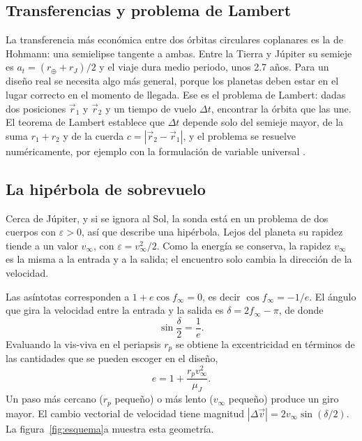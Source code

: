 \documentclass[12pt,letterpaper]{article}
\begin{document}
\subsection{Transferencias y problema de Lambert}

La transferencia más económica entre dos órbitas circulares coplanares es la de Hohmann: una
semielipse tangente a ambas. Entre la Tierra y Júpiter su semieje es $a_t = (r_\oplus +
r_J)/2$ y el viaje dura medio periodo, unos 2.7 años. Para un diseño real se necesita algo
más general, porque los planetas deben estar en el lugar correcto en el momento de llegada.
Ese es el problema de Lambert: dadas dos posiciones $\vec r_1$ y $\vec r_2$ y un tiempo de
vuelo $\Delta t$, encontrar la órbita que las une. El teorema de Lambert establece que
$\Delta t$ depende solo del semieje mayor, de la suma $r_1+r_2$ y de la cuerda
$c=|\vec r_2-\vec r_1|$, y el problema se resuelve numéricamente, por ejemplo con la
formulación de variable universal \cite{curtis2020}.

\subsection{La hipérbola de sobrevuelo}

Cerca de Júpiter, y si se ignora al Sol, la sonda está en un problema de dos cuerpos con
$\varepsilon>0$, así que describe una hipérbola. Lejos del planeta su rapidez tiende a un
valor $v_\infty$, con $\varepsilon = v_\infty^2/2$. Como la energía se conserva, la rapidez
$v_\infty$ es la misma a la entrada y a la salida; el encuentro solo cambia la dirección
de la velocidad.

Las asíntotas corresponden a $1+e\cos f_\infty=0$, es decir $\cos f_\infty = -1/e$. El
ángulo que gira la velocidad entre la entrada y la salida es $\delta = 2f_\infty - \pi$, de
donde
\begin{equation}
\sin\frac{\delta}{2} = \frac{1}{e}.
\end{equation}
Evaluando la vis-viva en el periapsis $r_p$ se obtiene la excentricidad en términos de las
cantidades que se pueden escoger en el diseño,
\begin{equation}
e = 1 + \frac{r_p v_\infty^2}{\mu_J}.
\end{equation}
Un paso más cercano ($r_p$ pequeño) o más lento ($v_\infty$ pequeño) produce un giro mayor.
El cambio vectorial de velocidad tiene magnitud $|\Delta\vec v| = 2v_\infty\sin(\delta/2)$.
La figura~\ref{fig:esquema}a muestra esta geometría.
\end{document}
